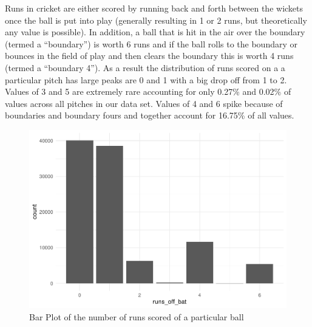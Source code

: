 \documentclass[
  12pt,
]{article}
\begin{document}
Runs in cricket are either scored by running back and forth between the
wickets once the ball is put into play (generally resulting in 1 or 2
runs, but theoretically any value is possible). In addition, a ball that
is hit in the air over the boundary (termed a ``boundary'') is worth 6
runs and if the ball rolls to the boundary or bounces in the field of
play and then clears the boundary this is worth 4 runs (termed a
``boundary 4''). As a result the distribution of runs scored on a a
particular pitch has large peaks are 0 and 1 with a big drop off from 1
to 2. Values of 3 and 5 are extremely rare accounting for only 0.27\%
and 0.02\% of values across all pitches in our data set. Values of 4 and
6 spike because of boundaries and boundary fours and together account
for 16.75\% of all values.

\begin{figure}

{\centering \includegraphics{paper_files/figure-latex/bar-1} 

}

\caption{Bar Plot of the number of runs scored of a particular ball}\label{fig:bar}
\end{figure}
\end{document}
